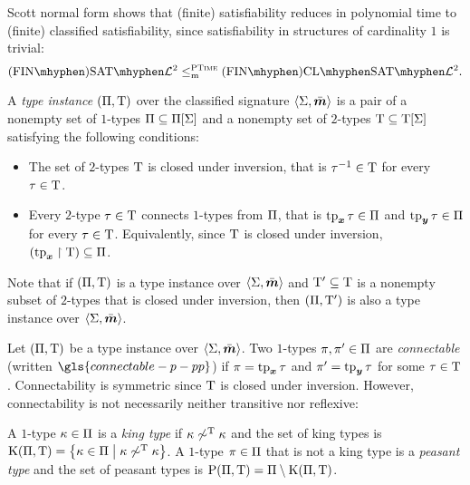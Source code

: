 Scott normal form shows that (finite) satisfiability reduces
in polynomial time to (finite) classified satisfiability, since satisfiability in structures of
cardinality $1$ is trivial:
\[
  \FinASat{\vFo2} \red\cP \FinAClSat{\vFo2}.
\]
\begin{definition}\label{def:tpinst-twovar}
A \emph{type instance} $(\Pi,\mathrm{T})$ over the classified
signature $\left\langle \mathrm{\Sigma},\bar{\bm{m}} \right\rangle$ is a pair of a nonempty set of $1$-types
$\Pi\subseteq\Pi[\mathrm{\Sigma}]$ and a nonempty set of $2$-types
$\mathrm{T}\subseteq\mathrm{T}[\mathrm{\Sigma}]$ satisfying the following conditions:
\begin{itemize}
  \item The set of $2$-types $\mathrm{T}$ is closed under
  inversion, that is $\tau^{-1}\in\mathrm{T}$ for every $\tau\in\mathrm{T}$.
  \item Every $2$-type $\tau\in\mathrm{T}$ connects $1$-types
  from $\Pi$, that is $\operatorname{tp}_{\bm{x}}\tau\in\Pi$ and $\operatorname{tp}_{\bm{y}}\tau\in\Pi$ for every
  $\tau\in\mathrm{T}$.
  Equivalently, since $\mathrm{T}$ is closed under inversion,
  $(\operatorname{tp}_{\bm{x}}\restriction\mathrm{T})\subseteq\Pi$.
\end{itemize}
Note that if $(\Pi,\mathrm{T})$ is a type instance over $\left\langle \mathrm{\Sigma},\bar{\bm{m}} \right\rangle$ and
${\mathrm{T}'} \subseteq \mathrm{T}$ is a nonempty subset of $2$-types that is closed 
under inversion, then $(\Pi,{\mathrm{T}'})$ is also a type instance over
$\left\langle \mathrm{\Sigma},\bar{\bm{m}} \right\rangle$.
\end{definition}
\begin{definition}\label{def:connectable}
Let $(\Pi,\mathrm{T})$ be a type instance over $\left\langle \mathrm{\Sigma},\bar{\bm{m}} \right\rangle$.
Two $1$-types $\pi, {\pi'} \in \Pi$ are \emph{connectable} 
(written $\gls{connectable-p-pp}$)
if $\pi = \operatorname{tp}_{\bm{x}}\tau$ and ${\pi'} = \operatorname{tp}_{\bm{y}}\tau$ for some $\tau \in \mathrm{T}$.
Connectability is symmetric since $\mathrm{T}$ is closed under inversion.
However, connectability is not necessarily neither transitive nor reflexive:

A $1$-type $\kappa \in \Pi$ is a \emph{king type} if $\kappa \not\sim^{\mathrm{T}}
\kappa$ and the set of king types is
$\mathrm{K}(\Pi,\mathrm{T}) = \left\{\kappa\in\Pi\mathrel{}\middle|\mathrel{}\kappa \not\sim^{\mathrm{T}} \kappa\right\}$.
A $1$-type $\pi \in \Pi$ that is not a king type is a \emph{peasant type}
and the set of peasant types is $\mathrm{P}(\Pi,\mathrm{T}) = \Pi \setminus
\mathrm{K}(\Pi,\mathrm{T})$.
\end{definition}


